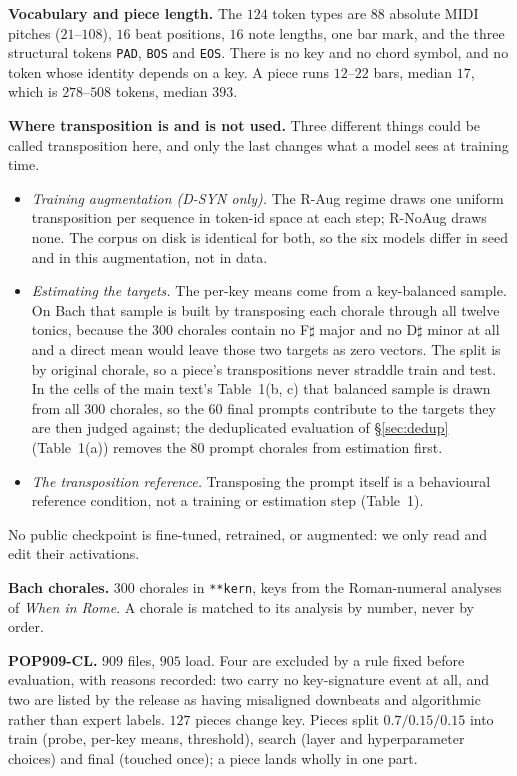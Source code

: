 \documentclass{article}
\begin{document}
\textbf{Vocabulary and piece length.} The $124$ token types are $88$ absolute MIDI
pitches ($21$--$108$), $16$ beat positions, $16$ note lengths, one bar mark, and the
three structural tokens \texttt{PAD}, \texttt{BOS} and \texttt{EOS}. There is no key
and no chord symbol, and no token whose identity depends on a key. A piece runs
$12$--$22$ bars, median $17$, which is $278$--$508$ tokens, median $393$.

\textbf{Where transposition is and is not used.} Three different things could be
called transposition here, and only the last changes what a model sees at training
time.
\begin{itemize}
\item \emph{Training augmentation (D-SYN only).} The R-Aug regime draws one uniform
transposition per sequence in token-id space at each step; R-NoAug draws none. The
corpus on disk is identical for both, so the six models differ in seed and in this
augmentation, not in data.
\item \emph{Estimating the targets.} The per-key means come from a key-balanced
sample. On Bach that sample is built by transposing each chorale through all twelve
tonics, because the $300$ chorales contain no F$\sharp$ major and no D$\sharp$ minor
at all and a direct mean would leave those two targets as zero vectors. The split is
by original chorale, so a piece's transpositions never straddle train and test. In the
cells of the main text's Table~1(b, c) that balanced sample is drawn from all $300$
chorales, so the $60$ final prompts contribute to the targets they are then judged
against; the deduplicated evaluation of \S\ref{sec:dedup} (Table~1(a)) removes the $80$
prompt chorales from estimation first.
\item \emph{The transposition reference.} Transposing the prompt itself is a
behavioural reference condition, not a training or estimation step (Table~1).
\end{itemize}
No public checkpoint is fine-tuned, retrained, or augmented: we only read and edit
their activations.

\textbf{Bach chorales.} $300$ chorales in \texttt{**kern}, keys from the
Roman-numeral analyses of \emph{When in Rome}. A chorale is matched to its analysis by
number, never by order.

\textbf{POP909-CL.} $909$ files, $905$ load. Four are excluded by a rule fixed before
evaluation, with reasons recorded: two carry no key-signature event at all, and two are
listed by the release as having misaligned downbeats and algorithmic rather than expert
labels. $127$ pieces change key. Pieces split $0.7/0.15/0.15$ into train (probe,
per-key means, threshold), search (layer and hyperparameter choices) and final
(touched once); a piece lands wholly in one part.
\end{document}
